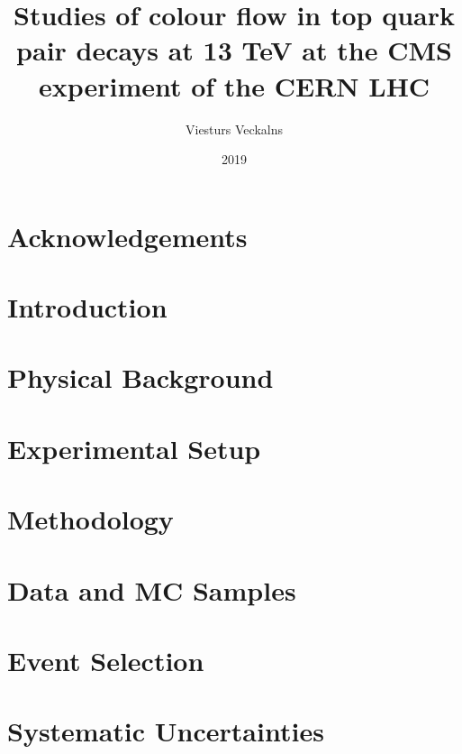\documentclass[titlepage, a4paper, EN]{mythesis}
\title{Studies of colour flow in top quark pair decays at 13 TeV at the CMS experiment of the CERN LHC}
\author{Viesturs Veckalns}
\date{2019}
\begin{document}
\maketitle
\begin{abstract}
        
\end{abstract}

\chapter*{Acknowledgements}
\label{chap:acknowledgements}


\tableofcontents

\chapter{Introduction}
\label{chap:introduction}


\chapter{Physical Background}


\chapter{Experimental Setup}
\label{sec:experimental_setup}


\chapter{Methodology}
\label{chap:methodology}


\chapter{Data and MC Samples}


\chapter{Event Selection}
\label{chap:event_selection}


\chapter{Systematic Uncertainties}
\label{chap:systematic_uncertainties}

\end{document}
